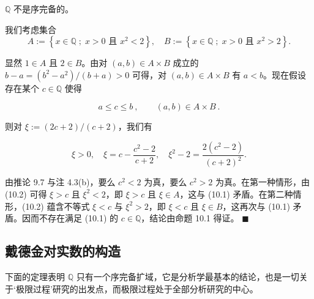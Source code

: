\begin{example}

$ \mathbb{Q} $ 不是序完备的。

\proofhead
我们考虑集合
\[
A:=\left\{x\in\mathbb{Q}\;;\;x>0\text{ 且 }x^{2}<2\right\},\quad B:=\left\{x\in\mathbb{Q}\;;\;x>0\text{ 且 }x^{2}>2\right\}.
\]

显然 $ 1 \in A $ 且 $ 2 \in B $。由对 $ (a, b) \in A \times B $ 成立的 $ b - a = (b^2 - a^2)/(b + a) > 0 $ 可得，对 $ (a, b) \in A \times B $ 有 $ a < b $。现在假设存在某个 $ c \in \mathbb{Q} $ 使得

\begin{equation}
a\leq c\leq b~,\qquad(a,b)\in A\times B~.
\end{equation}

则对 $ \xi := (2c + 2)/(c + 2) $，我们有

\begin{equation}
\xi>0,\quad\xi=c-\frac{c^{2}-2}{c+2},\quad\xi^{2}-2=\frac{2(c^{2}-2)}{(c+2)^{2}}.
\end{equation}

由推论 9.7 与注 4.3(b)，要么 $ c^2 < 2 $ 为真，要么 $ c^2 > 2 $ 为真。在第一种情形，由 (10.2) 可得 $ \xi > c $ 且 $ \xi^2 < 2 $，即 $ \xi > c $ 且 $ \xi \in A $，这与 (10.1) 矛盾。在第二种情形，(10.2) 蕴含不等式 $ \xi < c $ 与 $ \xi^2 > 2 $，即 $ \xi < c $ 且 $ \xi \in B $，这再次与 (10.1) 矛盾。因而不存在满足 (10.1) 的 $ c \in \mathbb{Q} $，结论由命题 10.1 得证。 $ \blacksquare $

\end{example}

\subsection*{戴德金对实数的构造}

下面的定理表明 $ \mathbb{Q} $ 只有一个序完备扩域，它是分析学最基本的结论，也是一切关于‘极限过程’研究的出发点，而极限过程处于全部分析研究的中心。

